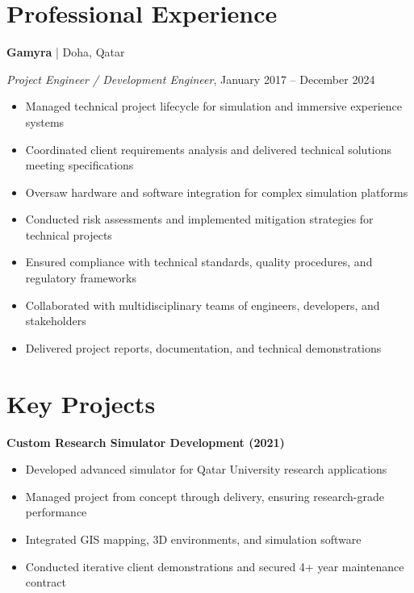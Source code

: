 \documentclass[a4paper,12pt]{article}
\begin{document}
\section{Professional Experience}

\textbf{Gamyra} | Doha, Qatar

\small{\textit{Project Engineer / Development Engineer}, January 2017 -- December 2024}

\begin{itemize}[nosep,after=\strut, leftmargin=1em, itemsep=3pt,label=--]
\item Managed technical project lifecycle for simulation and immersive experience systems
\item Coordinated client requirements analysis and delivered technical solutions meeting specifications
\item Oversaw hardware and software integration for complex simulation platforms
\item Conducted risk assessments and implemented mitigation strategies for technical projects
\item Ensured compliance with technical standards, quality procedures, and regulatory frameworks
\item Collaborated with multidisciplinary teams of engineers, developers, and stakeholders
\item Delivered project reports, documentation, and technical demonstrations
\end{itemize}


\section{Key Projects}

\textbf{Custom Research Simulator Development (2021)}
\begin{itemize}[nosep,after=\strut, leftmargin=1em, itemsep=2pt,label=--]
\item Developed advanced simulator for Qatar University research applications
\item Managed project from concept through delivery, ensuring research-grade performance
\item Integrated GIS mapping, 3D environments, and simulation software
\item Conducted iterative client demonstrations and secured 4+ year maintenance contract
\end{itemize}
\end{document}
